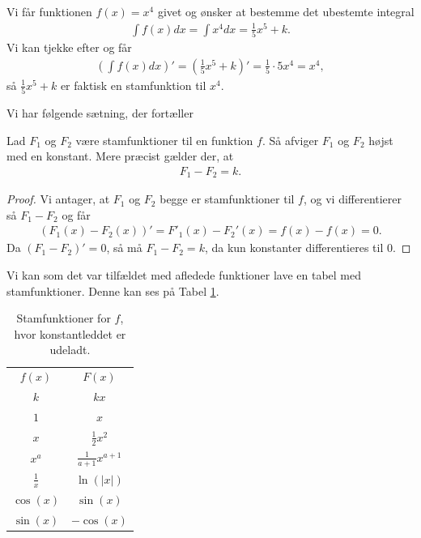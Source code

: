\begin{exa}
	Vi får funktionen $f(x) = x^4$ givet og ønsker at bestemme det ubestemte integral
	\begin{align*}
		\int f(x) dx = \int x^4 dx = \frac{1}{5}x^5 + k.
	\end{align*}
	Vi kan tjekke efter og får
	\begin{align*}
		\left(\int f(x) dx \right)' = \left(\frac{1}{5}x^5+ k\right)' = \frac{1}{5}\cdot 5x^4 = x^4, 
	\end{align*}
	så $\frac{1}{5}x^5 + k$ er faktisk en stamfunktion til $x^4$. 
\end{exa}
Vi har følgende sætning, der fortæller 
\begin{setn}
Lad $F_1$ og $F_2$ være stamfunktioner til en funktion $f$. Så afviger $F_1$ og $F_2$ højst med en konstant. Mere præcist gælder der, at 
\begin{align*}
F_1-F_2 = k.
\end{align*}
\end{setn}
\begin{proof}
Vi antager, at $F_1$ og $F_2$ begge er stamfunktioner til $f$, og vi differentierer så $F_1-F_2$ og får
\begin{align*}
	(F_1(x)-F_2(x))' = F'_1(x)-F_2'(x) = f(x)-f(x) = 0.
\end{align*}
Da $(F_1-F_2)' = 0$, så må $F_1-F_2=k$, da kun konstanter differentieres til $0$.  
\end{proof}

Vi kan som det var tilfældet med afledede funktioner lave en tabel med stamfunktioner. Denne kan ses på Tabel \ref{tab:stamfunktioner}.
\begin{table}[H]
	\centering
	\begin{tabular}{cc}
		$f(x)$ & $F(x)$ \\
		$k$    & $kx$ \\
		$1$    & $x$ \\
		$x$    & $\frac{1}{2}x^2$ \\
		$x^a$  & $\frac{1}{a+1}x^{a+1}$ \\
		$\frac{1}{x}$ & $\ln(|x|)$ \\
		$\cos(x)$ & $\sin(x)$ \\
		$\sin(x)$ & $-\cos(x)$ \\
	\end{tabular}
	\caption{Stamfunktioner for $f$, hvor konstantleddet er udeladt.}
	\label{tab:stamfunktioner}
\end{table}

